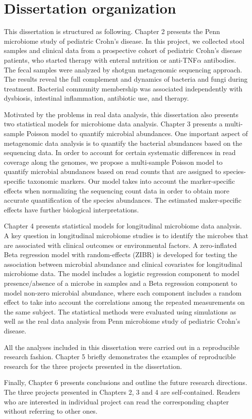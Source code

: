 \section{Dissertation organization }

This dissertation is structured as following. Chapter 2 presents the Penn microbiome study of pediatric Crohn's disease. In this project, we collected stool samples and clinical data from a prospective cohort of pediatric Crohn's disease patients, who started therapy with enteral nutrition or anti-TNF$\alpha$ antibodies. The fecal samples were analyzed by shotgun metagenomic sequencing approach. The results reveal the full complement and dynamics of bacteria and fungi during treatment. Bacterial community membership was associated independently with dysbiosis, intestinal inflammation, antibiotic use, and therapy.

Motivated by the problems in real data analysis, this dissertation also presents two statistical models for microbiome data analysis. Chapter 3 presents a multi-sample Poisson model to quantify microbial abundances. One important aspect of metagenomic data analysis is to quantify the bacterial abundances based on the sequencing data. In order to account for certain systematic differences in read coverage along the genomes, we propose a multi-sample Poisson model to quantify microbial abundances based on read counts that are assigned to species-specific taxonomic markers. Our model takes into account the marker-specific effects when normalizing the sequencing count data in order to obtain more accurate quantification of the species abundances.  The estimated maker-specific effects have further biological interpretations. 

Chapter 4 presents  statistical models  for longitudinal microbiome data analysis. A key question in longitudinal microbiome studies is to identify the microbes that are associated with clinical outcomes or environmental factors. A zero-inflated Beta regression model with random-effects (ZIBR) is developed for testing the association between microbial abundance and clinical covariates for longitudinal microbiome data. The model includes a logistic regression component to model presence/absence of a microbe in samples and a Beta regression component to model non-zero microbial abundance, where each component includes a random effect to take into account the correlations among the repeated measurements on the same subject. The statistical methods were evaluated using simulations as well as the real data analysis from Penn microbiome study of pediatric Crohn's disease.

All the analyses included in this dissertation were carried out in a  reproducible research fashion. Chapter 5 briefly demonstrates the examples of reproducible research for the three projects presented in the dissertation.

Finally, Chapter 6  presents conclusions and outline the future research directions. The three projects presented in Chapters 2, 3 and 4 are self-contained. Readers who are interested in individual project can read the corresponding chapter without referring to other ones.

